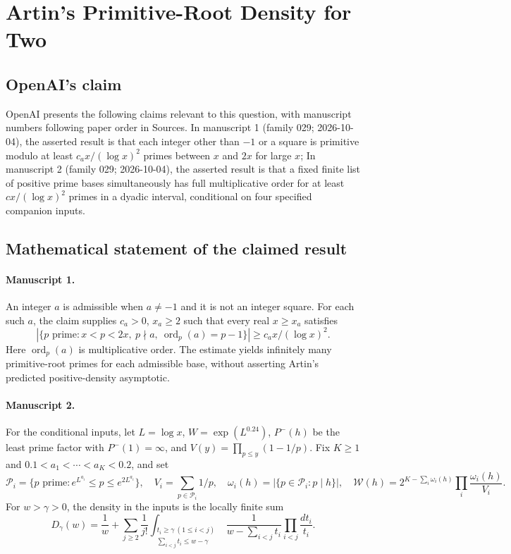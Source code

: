 \documentclass[11pt]{article}
\begin{document}
\section*{Artin’s Primitive-Root Density for Two}

\subsection{OpenAI's claim}
OpenAI presents the following claims relevant to this question, with manuscript numbers following paper order in Sources. In manuscript 1 (family 029; 2026-10-04), the asserted result is that each integer other than $-1$ or a square is primitive modulo at least $c_a x/(\log x)^2$ primes between $x$ and $2x$ for large $x$; In manuscript 2 (family 029; 2026-10-04), the asserted result is that a fixed finite list of positive prime bases simultaneously has full multiplicative order for at least $cx/(\log x)^2$ primes in a dyadic interval, conditional on four specified companion inputs.

\subsection{Mathematical statement of the claimed result}
\paragraph{Manuscript 1.}
An integer $a$ is admissible when $a\ne-1$ and it is not an integer square. For each such $a$, the claim supplies $c_a>0$, $x_a\ge2$ such that every real $x\ge x_a$ satisfies
\[
 |\{p\text{ prime}:x<p<2x,\ p\nmid a,\ \operatorname{ord}_p(a)=p-1\}|
 \ge c_a x/(\log x)^2.
\]
Here $\operatorname{ord}_p(a)$ is multiplicative order. The estimate yields infinitely many primitive-root primes for each admissible base, without asserting Artin's predicted positive-density asymptotic.

\paragraph{Manuscript 2.}
For the conditional inputs, let $L=\log x$, $W=\exp(L^{0.24})$, $P^-(h)$ be the least prime factor with $P^-(1)=\infty$, and $V(y)=\prod_{p\le y}(1-1/p)$. Fix $K\ge1$ and $0.1<a_1<\cdots<a_K<0.2$, and set
\[
 \mathcal P_i=\{p\text{ prime}:e^{L^{a_i}}\le p\le e^{2L^{a_i}}\},\quad
 V_i=\sum_{p\in\mathcal P_i}1/p,\quad\omega_i(h)=|\{p\in\mathcal P_i:p\mid h\}|,
 \quad\mathcal W(h)=2^{K-\sum_i\omega_i(h)}\prod_i\frac{\omega_i(h)}{V_i}.
\]
For $w>\gamma>0$, the density in the inputs is the locally finite sum
\[
 D_{\gamma}(w)=\frac1w+
 \sum_{j\ge2}\frac1{j!}
 \int_{\substack{t_i\ge\gamma\ (1\le i<j)\\\sum_{i<j}t_i\le w-\gamma}}
 \frac1{w-\sum_{i<j}t_i}\prod_{i<j}\frac{dt_i}{t_i}.
\]
\end{document}
